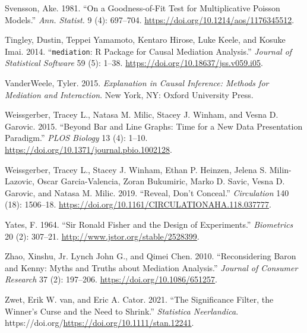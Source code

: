 \documentclass[
  11pt,
  letterpaper,
]{scrbook}
\newlength{\cslhangindent}
\newenvironment{CSLReferences}[2] %
 {\begin{list}{}{%
  \setlength{\itemindent}{0pt}
  \setlength{\leftmargin}{0pt}
  \setlength{\parsep}{0pt}
  \ifodd #1
   \setlength{\leftmargin}{\cslhangindent}
   \setlength{\itemindent}{-1\cslhangindent}
  \fi
  \setlength{\itemsep}{#2\baselineskip}}}
 {\end{list}}
\theoremstyle{definition}
\theoremstyle{definition}
\theoremstyle{remark}
\begin{document}
\begin{CSLReferences}{1}{0}
Svensson, Ake. 1981. {``On a Goodness-of-Fit Test for Multiplicative
{P}oisson Models.''} \emph{Ann. Statist.} 9 (4): 697--704.
\url{https://doi.org/10.1214/aos/1176345512}.

Tingley, Dustin, Teppei Yamamoto, Kentaro Hirose, Luke Keele, and Kosuke
Imai. 2014. {``\texttt{mediation}: {R} Package for Causal Mediation
Analysis.''} \emph{Journal of Statistical Software} 59 (5): 1--38.
\url{https://doi.org/10.18637/jss.v059.i05}.

VanderWeele, Tyler. 2015. \emph{Explanation in Causal Inference: Methods
for Mediation and Interaction}. New York, NY: Oxford University Press.

Weissgerber, Tracey L., Natasa M. Milic, Stacey J. Winham, and Vesna D.
Garovic. 2015. {``Beyond Bar and Line Graphs: Time for a New Data
Presentation Paradigm.''} \emph{PLOS Biology} 13 (4): 1--10.
\url{https://doi.org/10.1371/journal.pbio.1002128}.

Weissgerber, Tracey L., Stacey J. Winham, Ethan P. Heinzen, Jelena S.
Milin-Lazovic, Oscar Garcia-Valencia, Zoran Bukumiric, Marko D. Savic,
Vesna D. Garovic, and Natasa M. Milic. 2019. {``Reveal, Don't
Conceal.''} \emph{Circulation} 140 (18): 1506--18.
\url{https://doi.org/10.1161/CIRCULATIONAHA.118.037777}.

Yates, F. 1964. {``Sir {R}onald {F}isher and the Design of
Experiments.''} \emph{Biometrics} 20 (2): 307--21.
\url{http://www.jstor.org/stable/2528399}.

Zhao, Xinshu, Jr. Lynch John G., and Qimei Chen. 2010. {``Reconsidering
{B}aron and {K}enny: Myths and Truths about Mediation Analysis.''}
\emph{Journal of Consumer Research} 37 (2): 197--206.
\url{https://doi.org/10.1086/651257}.

Zwet, Erik W. van, and Eric A. Cator. 2021. {``The Significance Filter,
the Winner's Curse and the Need to Shrink.''} \emph{Statistica
Neerlandica}. https://doi.org/\url{https://doi.org/10.1111/stan.12241}.

\end{CSLReferences}


\backmatter
\end{document}
